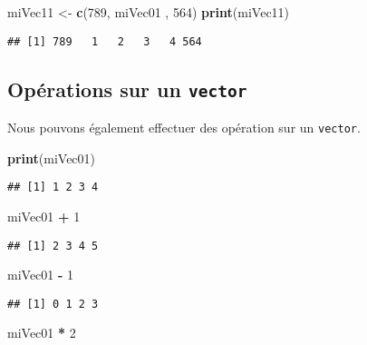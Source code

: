 \documentclass[]{book}
\newenvironment{Shaded}{\begin{snugshade}}{\end{snugshade}}
\newcommand{\KeywordTok}[1]{\textcolor[rgb]{0.13,0.29,0.53}{\textbf{#1}}}
\newcommand{\DecValTok}[1]{\textcolor[rgb]{0.00,0.00,0.81}{#1}}
\newcommand{\StringTok}[1]{\textcolor[rgb]{0.31,0.60,0.02}{#1}}
\newcommand{\OperatorTok}[1]{\textcolor[rgb]{0.81,0.36,0.00}{\textbf{#1}}}
\newcommand{\NormalTok}[1]{#1}
\theoremstyle{definition}
\theoremstyle{definition}
\theoremstyle{definition}
\theoremstyle{remark}
\begin{document}
\begin{Shaded}
\begin{Highlighting}[]
\NormalTok{miVec11 <-}\StringTok{ }\KeywordTok{c}\NormalTok{(}\DecValTok{789}\NormalTok{, miVec01 , }\DecValTok{564}\NormalTok{)}
\KeywordTok{print}\NormalTok{(miVec11)}
\end{Highlighting}
\end{Shaded}

\begin{verbatim}
## [1] 789   1   2   3   4 564
\end{verbatim}

\subsection{\texorpdfstring{Opérations sur un
\texttt{vector}}{Opérations sur un vector}}\label{operations-sur-un-vector}

Nous pouvons également effectuer des opération sur un \texttt{vector}.

\begin{Shaded}
\begin{Highlighting}[]
\KeywordTok{print}\NormalTok{(miVec01)}
\end{Highlighting}
\end{Shaded}

\begin{verbatim}
## [1] 1 2 3 4
\end{verbatim}

\begin{Shaded}
\begin{Highlighting}[]
\NormalTok{miVec01 }\OperatorTok{+}\StringTok{ }\DecValTok{1}
\end{Highlighting}
\end{Shaded}

\begin{verbatim}
## [1] 2 3 4 5
\end{verbatim}

\begin{Shaded}
\begin{Highlighting}[]
\NormalTok{miVec01 }\OperatorTok{-}\StringTok{ }\DecValTok{1}
\end{Highlighting}
\end{Shaded}

\begin{verbatim}
## [1] 0 1 2 3
\end{verbatim}

\begin{Shaded}
\begin{Highlighting}[]
\NormalTok{miVec01 }\OperatorTok{*}\StringTok{ }\DecValTok{2}
\end{Highlighting}
\end{Shaded}
\end{document}
